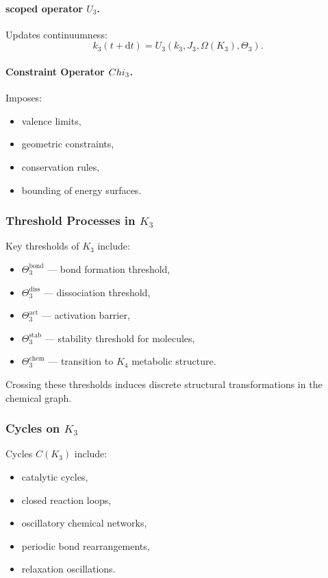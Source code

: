 \paragraph{scoped operator \texorpdfstring{$U_3$}{U_3}.}
Updates continuumness:
\[
k_3(t+\mathrm{d}t) = U_3(k_3, J_3, \Omega(K_3), \Theta_3).
\]

\paragraph{Constraint Operator \texorpdfstring{$Chi_3$}{\Chi_3}.}
Imposes:
\begin{itemize}
    \item valence limits,
    \item geometric constraints,
    \item conservation rules,
    \item bounding of energy surfaces.
\end{itemize}

\subsubsection{Threshold Processes in \texorpdfstring{$K_3$}{K_3}}

Key thresholds of $K_3$ include:

\begin{itemize}
    \item $\Theta_3^{\text{bond}}$ — bond formation threshold,
    \item $\Theta_3^{\text{diss}}$ — dissociation threshold,
    \item $\Theta_3^{\text{act}}$ — activation barrier,
    \item $\Theta_3^{\text{stab}}$ — stability threshold for molecules,
    \item $\Theta_3^{\text{chem}}$ — transition to $K_4$ metabolic structure.
\end{itemize}

Crossing these thresholds induces discrete structural transformations in
the chemical graph.

\subsubsection{Cycles on \texorpdfstring{$K_3$}{K_3}}

Cycles $C(K_3)$ include:
\begin{itemize}
    \item catalytic cycles,
    \item closed reaction loops,
    \item oscillatory chemical networks,
    \item periodic bond rearrangements,
    \item relaxation oscillations.
\end{itemize}

